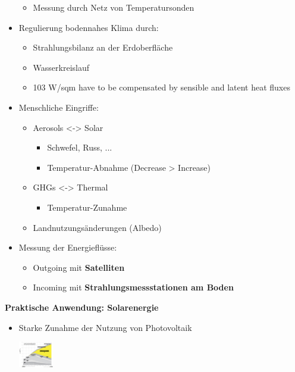 \documentclass[fontsize=8pt, a4paper, landscape, fleqn]{scrartcl}
\renewcommand{\subsection}[1]{%
    \noindent\colorbox{subsectioncolor}{%
        \parbox{\dimexpr\columnwidth-2\fboxsep}{\color{white}\textbf{#1}}}%
    \vspace{0.5mm}%
}
\begin{document}
\begin{multicols*}{3}[\raggedcolumns]
\begin{itemize}
        \begin{itemize}
            \item Messung durch Netz von Temperatursonden
        \end{itemize}
    \item Regulierung bodennahes Klima durch:
        \begin{itemize}
            \item Strahlungsbilanz an der Erdoberfläche 
            \item Wasserkreislauf
            \item 103 W/sqm have to be compensated by sensible and latent heat fluxes
        \end{itemize}
    \item Menschliche Eingriffe:
        \begin{itemize}
            \item Aerosols <-> Solar
                \begin{itemize}
                    \item Schwefel, Russ, ...
                    \item Temperatur-Abnahme (Decrease > Increase)
                \end{itemize}
            \item GHGs <-> Thermal
                \begin{itemize}
                    \item Temperatur-Zunahme
                \end{itemize}
            \item Landnutzungsänderungen (Albedo) 
        \end{itemize}
    \item Messung der Energieflüsse:
        \begin{itemize}
            \item Outgoing mit \textbf{Satelliten}
            \item Incoming mit \textbf{Strahlungsmessstationen am Boden}
        \end{itemize}
\end{itemize}

\subsection{Praktische Anwendung: Solarenergie}
\begin{itemize}
    \item Starke Zunahme der Nutzung von Photovoltaik 
    \begin{center}
        \includegraphics[width=0.12\textwidth]{Secondary/img/Pasted image 20250407180632.png}
    \end{center}
\end{itemize}


\end{multicols*}
\end{document}
